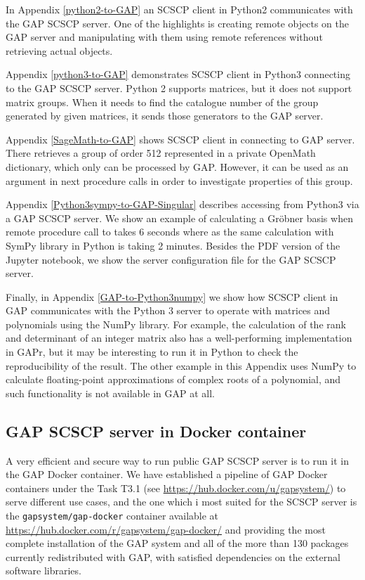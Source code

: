 \documentclass{deliverablereport}
\begin{document}
In Appendix \ref{python2-to-GAP} an SCSCP client in Python2 
communicates with the GAP SCSCP server. One of the highlights is
creating remote objects on the GAP server and manipulating
with them using remote references without retrieving actual
objects.

Appendix \ref{python3-to-GAP} demonstrates SCSCP client in 
Python3 connecting to the GAP SCSCP server. Python 2 supports
matrices, but it does not support matrix groups. When it needs
to find the catalogue number of the group generated by given
matrices, it sends those generators to the GAP server.

Appendix \ref{SageMath-to-GAP} shows SCSCP client in \Sage 
connecting to GAP server. There \Sage retrieves a group of order
512 represented in a private OpenMath dictionary, which only
can be processed by GAP. However, it can be used as an argument
in next procedure calls in order to investigate properties of 
this group.

Appendix \ref{Python3sympy-to-GAP-Singular} describes
accessing \Singular from Python3 via a GAP SCSCP server. 
We show an example of calculating a Gr\"obner basis when
remote procedure call to \Singular takes 6 seconds where
as the same calculation with SymPy library in Python is
taking 2 minutes. Besides the PDF version of the Jupyter
notebook, we show the server configuration file for the
GAP SCSCP server.

Finally, in Appendix \ref{GAP-to-Python3numpy} we show how
SCSCP client in GAP communicates with the Python 3 server
to operate with matrices and polynomials using the NumPy
library. For example, the calculation of the rank and
determinant of an integer matrix also has a well-performing
implementation in GAPr, but it may be interesting to run
it in Python to check the reproducibility of the result.
The other example in this Appendix uses NumPy to calculate
floating-point approximations of complex roots of a 
polynomial, and such functionality is not available in GAP
at all.


\subsection{GAP SCSCP server in Docker container}\label{gap-docker}

A very efficient and secure way to run public GAP SCSCP
server is to run it in the GAP Docker container. 
We have established a pipeline of GAP Docker containers
under the Task T3.1 (see \url{https://hub.docker.com/u/gapsystem/})
to serve different use cases, and the one which i most
suited for the SCSCP server is the {\tt gapsystem/gap-docker} 
container available at \url{https://hub.docker.com/r/gapsystem/gap-docker/} and
providing the most complete installation
of the GAP system and all of the more than 130 packages
currently redistributed with GAP, with satisfied dependencies
on the external software libraries.
\end{document}

